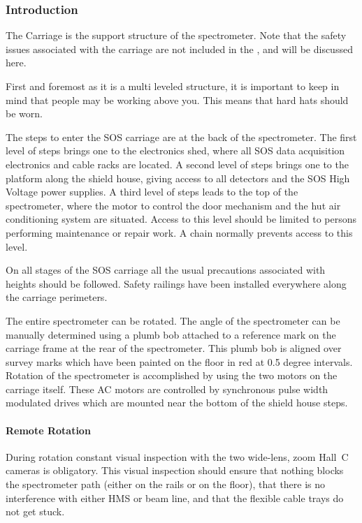 \subsubsection{Introduction}

	The Carriage is the support structure of the spectrometer.
Note that the safety issues associated with the carriage are not included
in the ,
and will be discussed here.

First and foremost as it is a multi leveled structure, it is important to keep in
mind that people may be working above you. This means that hard hats should
be worn.

The steps to enter the SOS carriage are at the back of the spectrometer.
The first level of steps brings one to the electronics shed, where all
SOS data acquisition electronics and cable racks are located.
A second level of steps brings one to the platform along the
shield house, giving access to all detectors and the SOS High Voltage
power supplies.
A third level of steps leads
to the top of the spectrometer, where the motor to control the door
mechanism and the hut air conditioning system are situated.
Access to this level should be limited to
persons performing maintenance or repair work. A chain normally
prevents access to this level.

On all stages of the SOS carriage
all the usual precautions associated with heights should be followed.
Safety railings have been installed everywhere along the carriage perimeters.

The entire spectrometer can be rotated. The angle of the spectrometer
can be manually determined using a plumb bob attached to a reference mark on the
carriage frame at the rear of the spectrometer.
This plumb bob is aligned over survey marks which have been painted
on the floor in red at 0.5 degree intervals. Rotation of the spectrometer
is accomplished by using the two motors on the carriage itself.
These AC motors are controlled by synchronous pulse width modulated
drives which are mounted near the bottom of the shield house steps.

\paragraph{Remote Rotation}


During rotation constant visual inspection with the two wide-lens, zoom Hall~C
cameras is obligatory. This visual inspection should ensure that nothing
blocks the spectrometer path (either on the rails or on the floor), that there
is no interference with either HMS or beam line, and that the flexible cable
trays do not get stuck.

